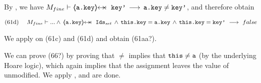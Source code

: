 \begin{proofO}
By  {}, we have $M_{fine} \vdash  \protectedFrom {\prg{a.key}} {\prg{key'}} \, \longrightarrow\, {\prg{a.key}}\neq {\prg{key'}}$, and therefore obtain

\begin{align*}
\text{(61d)}  \ \ \ \ M_{fine} \vdash  ... \wedge \, \protectedFrom {\prg{a.key}} {\Idsset} \, \wedge  \, \prg{this.key}=\prg{a.key}\, \wedge\,  \prg{this.key}=\prg{key'}\ \longrightarrow \ false 
\end{align*}

We apply  {} on (61c) and (61d) and obtain (61aa?).

\vspace{.5cm}
We can prove (66?) by proving that $\neq$ implies that $\mbox{\normalfont{\texttt{this}}}\neq \mbox{\normalfont{\texttt{a}}}$ (by the underlying Hoare logic), which again implies that the assignment  leaves the value of  unmodified. We apply {}, and are done.

\end{proofO} 


